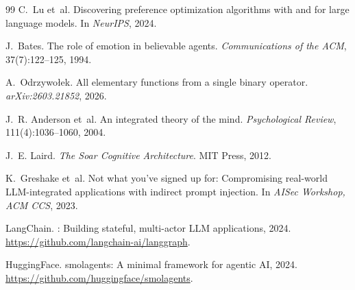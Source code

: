 \documentclass[12pt,a4paper]{article}
\begin{document}
\begin{thebibliography}{99}
C.~Lu et~al.
\newblock Discovering preference optimization algorithms with and for large language models.
\newblock In \emph{NeurIPS}, 2024.

J.~Bates.
\newblock The role of emotion in believable agents.
\newblock \emph{Communications of the ACM}, 37(7):122--125, 1994.

A.~Odrzyw{o\l}ek.
\newblock All elementary functions from a single binary operator.
\newblock \emph{arXiv:2603.21852}, 2026.

J.~R. Anderson et~al.
\newblock An integrated theory of the mind.
\newblock \emph{Psychological Review}, 111(4):1036--1060, 2004.

J.~E. Laird.
\newblock \emph{The {S}oar Cognitive Architecture}.
\newblock MIT Press, 2012.

K.~Greshake et~al.
\newblock Not what you've signed up for: Compromising real-world {LLM}-integrated applications
  with indirect prompt injection.
\newblock In \emph{AISec Workshop, ACM CCS}, 2023.

LangChain.
: Building stateful, multi-actor {LLM} applications, 2024.
\newblock \url{https://github.com/langchain-ai/langgraph}.

HuggingFace.
\newblock smolagents: A minimal framework for agentic {AI}, 2024.
\newblock \url{https://github.com/huggingface/smolagents}.

\end{thebibliography}
\end{document}
